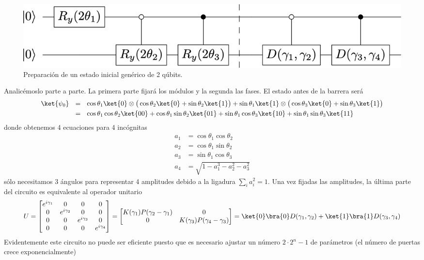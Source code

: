 \documentclass[a4paper,11pt]{book} %
\numberwithin{equation}{chapter}
\begin{document}
	\begin{figure}[H]
	\centering 
	\includegraphics[width=0.65\linewidth]{Figuras/Fig_InicialOracle_preparestatecircuit.png}
	\caption{Preparación de un estado inicial genérico de 2 qúbits.}
	\label{Fig_InicialOracle_preparestatecircuit}
	\end{figure}

Analicémoslo parte a parte. La primera parte fijará los módulos y la segunda las fases. El estado antes de la barrera será
	\begin{align*}
	\ket{\psi_0}~~ 
	&= ~~ \cos\theta_1 \ket{0}\otimes \big( \cos\theta_2 \ket{0} + \sin\theta_2\ket{1}\big) 
		+ \sin\theta_1\ket{1}\otimes \big(\cos\theta_3\ket{0} + \sin\theta_3\ket{1}\big) \\
	&= ~~ \cos\theta_1 \cos\theta_2 \ket{00} + \cos\theta_1\sin\theta_2\ket{01} + \sin\theta_1\cos\theta_3\ket{10} 
		+ \sin\theta_1\sin\theta_3\ket{11} 
	\end{align*}
donde obtenemos 4 ecuaciones para 4 incógnitas
	\begin{align*}
	a_1 &=  \cos\theta_1 \cos\theta_2  \\
	a_2 &=  \cos\theta_1\sin\theta_2   \\
	a_3 &=  \sin\theta_1\cos\theta_3   \\
	a_4 &=  \sqrt{1-a_1^3-a_2^2-a_3^2}
	\end{align*}
sólo necesitamos 3 ángulos para representar 4 amplitudes debido a la ligadura $\sum_i a_i^2 = 1$.
Una vez fijadas las amplitudes, la última parte del circuito es equivalente al  operador unitario
	\begin{equation}
	U = 
	\begin{bmatrix} 
		e^{i\gamma_1} & 0 & 0 & 0    \\ 
		0 & e^{i\gamma_2} & 0 & 0    \\ 
		0 & 0 & e^{i\gamma_3} & 0    \\ 
		0 & 0 & 0 & e^{i\gamma_4} 
	\end{bmatrix} = 
	\begin{bmatrix} 
		K(\gamma_1)P(\gamma_2-\gamma_1) & 0   \\  
		0 &K(\gamma_3) P(\gamma_4-\gamma_3) 
	\end{bmatrix}  
	= \ket{0}\bra{0}D(\gamma_1,\gamma_2) + \ket{1}\bra{1}D(\gamma_3,\gamma_4)  
	\end{equation}
Evidentemente este circuito no puede ser eficiente puesto que es necesario ajustar un número $2\cdot 2^n-1$ de parámetros (el número de puertas crece exponencialmente)
\end{document}
